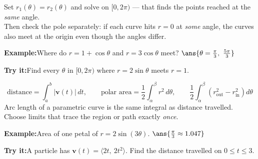 \documentclass[12pt]{article}
\begin{document}
\begin{formulabox}
Set $r_1(\theta) = r_2(\theta)$ and solve on $[0, 2\pi)$ --- that finds the
points reached at the \emph{same} angle.\\[3pt]
Then check the pole separately: if each curve hits $r=0$ at \emph{some} angle,
the curves also meet at the origin even though the angles differ.
\end{formulabox}
\begin{examplebox}
\textbf{Example:}\quad Where do $r = 1+\cos\theta$ and $r = 3\cos\theta$ meet?
$\ans{\theta = \tfrac{\pi}{3},\ \tfrac{5\pi}{3}}$
\end{examplebox}
\begin{tryitbox}
\textbf{Try it:}\quad Find every $\theta$ in $[0, 2\pi)$ where $r = 2\sin\theta$
meets $r = 1$.\\[2pt]
\end{tryitbox}

\begin{formulabox}
\[ \text{distance} = \int_a^b |\mathbf{v}(t)|\,dt, \qquad
   \text{polar area} = \frac{1}{2}\int_\alpha^\beta r^2\,d\theta, \qquad
   \frac{1}{2}\int_\alpha^\beta \left(r_{\text{out}}^2 - r_{\text{in}}^2\right) d\theta \]
Arc length of a parametric curve is the same integral as distance travelled.
Choose limits that trace the region or path exactly \emph{once}.
\end{formulabox}
\begin{examplebox}
\textbf{Example:}\quad Area of one petal of $r = 2\sin(3\theta)$.
$\ans{\tfrac{\pi}{3} \approx 1.047}$
\end{examplebox}
\begin{tryitbox}
\textbf{Try it:}\quad A particle has $\mathbf{v}(t) = \langle 2t,\ 2t^2\rangle$.
Find the distance travelled on $0 \le t \le 3$.\\[2pt]
\end{tryitbox}
\end{document}
